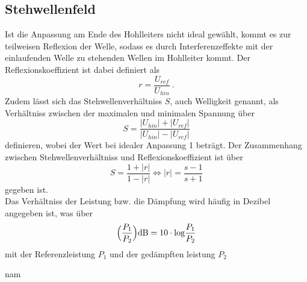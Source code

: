 \subsection{Stehwellenfeld}
Ist die Anpassung am Ende des Hohlleiters nicht ideal gewählt, kommt es zur teilweisen Reflexion
der Welle, sodass es durch Interferenzeffekte mit der einlaufenden Welle zu stehenden
Wellen im Hohlleiter kommt. Der Reflexionskoeffizient ist dabei definiert als
\begin{equation}
    r= \frac{U_{ref}}{U_{hin}} \:.
  \label{eqn:refl}
\end{equation}
Zudem lässt sich das Stehwellenverhältniss $S$, auch Welligkeit genannt, als Verhältniss
zwischen der maximalen und minimalen Spannung über
\begin{equation}
    S= \frac{\lvert U_{hin}\rvert + \lvert U_{ref}\rvert}{\lvert U_{hin}\rvert - \lvert U_{ref}\rvert}
  \label{eqn:SWV}
\end{equation}
definieren, wobei der Wert bei idealer Anpassung 1 beträgt. Der Zusammenhang zwischen Stehwellenverhältniss
und Reflexionskoeffizient ist über
\begin{equation}
    S= \frac{1 + \lvert r\rvert}{1 - \lvert r\rvert} \iff \lvert r\rvert = \frac{s-1}{s+1}
  \label{eqn:reflundSWV}
\end{equation}
gegeben ist. \\
Das Verhältniss der Leistung bzw. die Dämpfung wird häufig in Dezibel angegeben ist,
was über
\begin{equation}
    \Bigl(\frac{P_1}{P_2}\Bigr)\text{dB}=10\cdot\text{log}\frac{P_1}{P_2}
    \label{eqn:dezibel}
\end{equation}
mit der Referenzleistung $P_1$ und der gedämpften leistung $P_2$











nam
